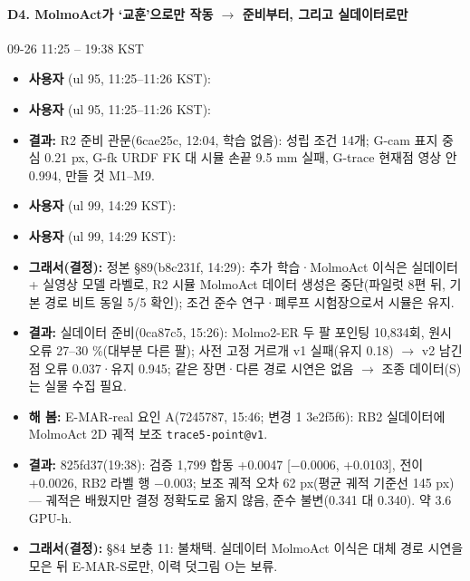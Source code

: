 \paragraph{D4. MolmoAct가 `교훈'으로만 작동 $\rightarrow$ 준비부터, 그리고 실데이터로만}
{\small 09-26 11:25 -- 19:38 KST}
\begin{itemize}
  \item \textbf{사용자} (ul 95, 11:25--11:26 KST): 
  \item \textbf{사용자} (ul 95, 11:25--11:26 KST): 
  \item \textbf{결과:} R2 준비 관문(6cae25c, 12:04, 학습 없음): 성립 조건 14개; G-cam 표지 중심 0.21 px, G-fk URDF FK 대 시뮬 손끝 9.5 mm 실패, G-trace 현재점 영상 안 0.994, 만들 것 M1--M9.
  \item \textbf{사용자} (ul 99, 14:29 KST): 
  \item \textbf{사용자} (ul 99, 14:29 KST): 
  \item \textbf{그래서(결정):} 정본 §89(b8c231f, 14:29): 추가 학습·MolmoAct 이식은 실데이터 + 실영상 모델 라벨로, R2 시뮬 MolmoAct 데이터 생성은 중단(파일럿 8편 뒤, 기본 경로 비트 동일 5/5 확인); 조건 준수 연구·폐루프 시험장으로서 시뮬은 유지.
  \item \textbf{결과:} 실데이터 준비(0ca87c5, 15:26): Molmo2-ER 두 팔 포인팅 10,834회, 원시 오류 27--30 \%(대부분 다른 팔); 사전 고정 거르개 v1 실패(유지 0.18) $\rightarrow$ v2 남긴 점 오류 0.037·유지 0.945; 같은 장면·다른 경로 시연은 없음 $\rightarrow$ 조종 데이터(S)는 실물 수집 필요.
  \item \textbf{해 봄:} E-MAR-real 요인 A(7245787, 15:46; 변경 1 3e2f5f6): RB2 실데이터에 MolmoAct 2D 궤적 보조 \texttt{trace5-\allowbreak{}point@v1}.
  \item \textbf{결과:} 825fd37(19:38): 검증 1,799 합동 +0.0047 [$-$0.0006, +0.0103], 전이 +0.0026, RB2 라벨 행 $-$0.003; 보조 궤적 오차 62 px(평균 궤적 기준선 145 px) --- 궤적은 배웠지만 결정 정확도로 옮지 않음, 준수 불변(0.341 대 0.340). 약 3.6 GPU-h.
  \item \textbf{그래서(결정):} §84 보충 11: 불채택. 실데이터 MolmoAct 이식은 대체 경로 시연을 모은 뒤 E-MAR-S로만, 이력 덧그림 O는 보류.
\end{itemize}

